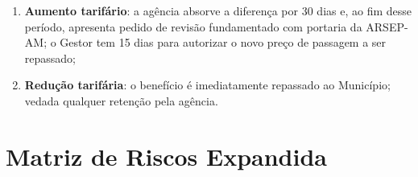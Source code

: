 \documentclass[12pt,a4paper]{article}
\begin{document}
\begin{enumerate}
  \item \textbf{Aumento tarifário}: a agência absorve a diferença por 30 dias
    e, ao fim desse período, apresenta pedido de revisão fundamentado com
    portaria da ARSEP-AM; o Gestor tem 15 dias para autorizar o novo preço
    de passagem a ser repassado;
  \item \textbf{Redução tarifária}: o benefício é imediatamente repassado ao
    Município; vedada qualquer retenção pela agência.
\end{enumerate}

\section{Matriz de Riscos Expandida}
\end{document}
